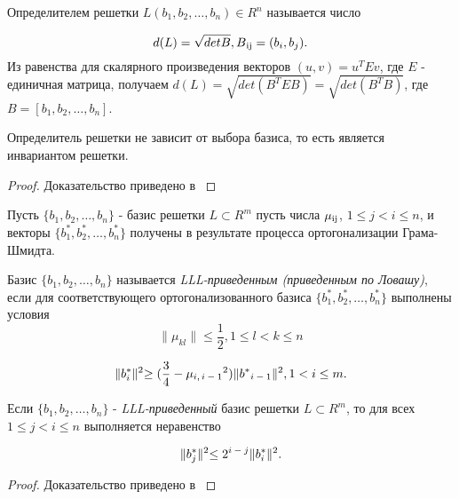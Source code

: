   \begin{definition}
   Определителем решетки {$L(b_1,b_2, \dots, b_n) \in R^n$} называется число
   
   \begin{equation}
    d(L) = \sqrt{detB}, B\textsubscript{ij} = (b_i, b_j).
   \end{equation}
   Из равенства для скалярного произведения векторов {$(u, v) = u^T E v$}, где $E$ - единичная матрица, получаем 
   $d(L) = \sqrt{det(B^TEB)} = \sqrt{det(B^TB)}$, где {$B = [b_1,b_2, \dots, b_n]$}.
  \end{definition}
  
  \begin{theorem}
   Определитель решетки не зависит от выбора базиса, то есть является инвариантом решетки.
   
   \begin{proof}
    Доказательство приведено в \cite[Глава 8.2, страница 261]{mah06}
  \end{proof}
  \end{theorem}  
  
  Пусть {$\{ b_1, b_2, \dots, b_n \}$} - базис решетки {$L \subset R^m$}  пусть числа {$\mu\textsubscript{ij}$}, {$1 \le j < i \le n$}, и векторы
  {$\{b_1^*, b_2^*, \dots, b_n^*\}$} получены в результате процесса ортогонализации Грама-Шмидта.
  
  \begin{definition}
   Базис {$\{b_1, b_2, \dots, b_n\}$} называется \textit{LLL-приведенным (приведенным по Ловашу)}, если для соответствующего ортогонализованного базиса
   {$\{b_1^*, b_2^*, \dots, b_n^*\}$} выполнены условия
    \begin{equation}
      \lVert \mu_{kl} \lVert \le \frac{1}{2}, 1 \le l < k \le n
    \end{equation}
   
   \begin{equation}
      \lVert b_i^* \lVert^2 \ge (\frac{3}{4} - \mu\textsubscript{{$i,i-1$}}^2)\lVert b^*\textsubscript{{$i-1$}} \lVert^2, 1<i \le m.
   \end{equation}

  \end{definition}
  
  \begin{lemma}
   Если {$\{b_1, b_2, \dots, b_n\}$} - \textit{LLL-приведенный} базис решетки {$L \subset R^m$}, то для всех {$1 \le j < i \le n$} выполняется неравенство
   
   \begin{equation}
    \lVert b_j^* \lVert^2 \le 2\textsuperscript{{$i-j$}} \lVert b_i^* \lVert^2.
   \end{equation}
   \begin{proof}
      Доказательство приведено в \cite[Глава 8.2, страница 265]{mah06}
   \end{proof}   
  \end{lemma}
  
